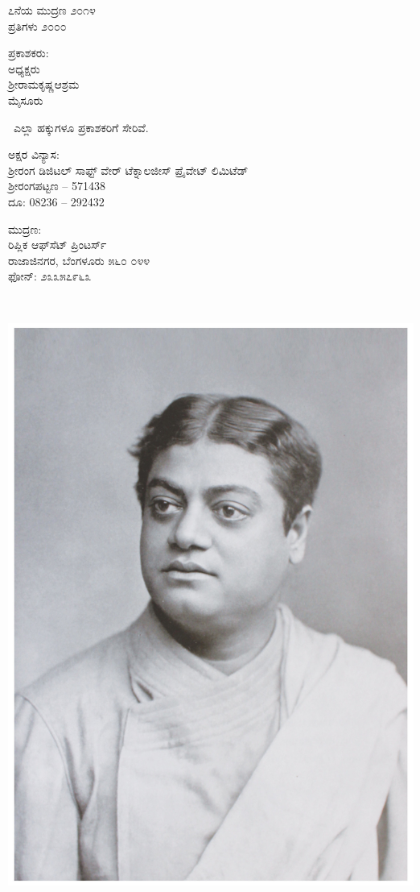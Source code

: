\thispagestyle{empty}
\begin{flushleft}
{\fontsize{10}{12.5}\selectfont
೭ನೆಯ ಮುದ್ರಣ ೨೦೧೪‍\\
ಪ್ರತಿಗಳು ೨೦೦೦
\vfill

ಪ್ರಕಾಶಕರು:\\
ಅಧ್ಯಕ್ಷರು\\
ಶ್ರೀರಾಮಕೃಷ್ಣಆಶ್ರಮ\\
ಮೈಸೂರು
\vfill

\eng{\copyright}\ ಎಲ್ಲಾ ಹಕ್ಕುಗಳೂ ಪ್ರಕಾಶಕರಿಗೆ ಸೇರಿವೆ.
\vfill

ಅಕ್ಷರ ವಿನ್ಯಾಸ:\\ಶ‍್ರೀರಂಗ ಡಿಜಿಟಲ್ ಸಾಫ್ಟ್ ‍ವೇರ್ ಟೆಕ್ನಾಲಜೀಸ್ ಪ್ರೈವೇಟ್ ಲಿಮಿಟೆಡ್\\ಶ‍್ರೀರಂಗಪಟ್ಟಣ – 571438\\ದೂ: 08236 – 292432
\vfill

ಮುದ್ರಣ:\\
ರಿಪ್ಲಿಕ ಆಫ್​ಸೆಟ್ ಪ್ರಿಂಟರ್ಸ್\\
ರಾಜಾಜಿನಗರ, ಬೆಂಗಳೂರು ೫೬೦ ೦೪೪\\
ಫೋನ್: ೨೩೩೫೭೯೬೩
}
\end{flushleft}

\newpage
~
\vfill
\begin{center}
\includegraphics{images/SV_Pic2.jpg}
\end{center}
\vfill
\eject
